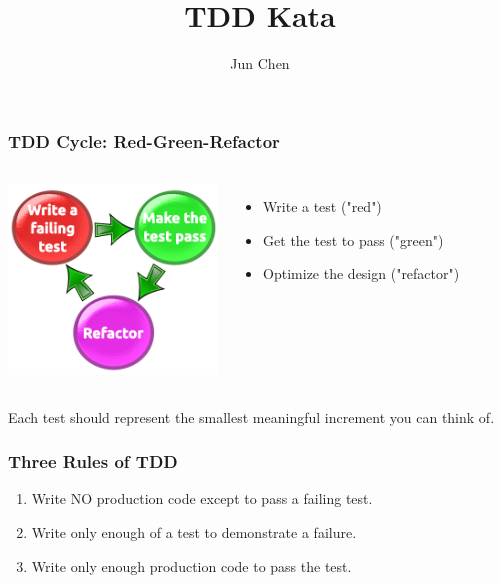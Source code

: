 \documentclass{beamer}
\title{TDD Kata}
\author{Jun Chen}
\begin{document}

\begin{frame}
\titlepage
\end{frame}


\begin{frame}
 \frametitle{TDD Cycle: Red-Green-Refactor}

 \begin{columns}

 \includegraphics[height=2.0in]{TDD-cycle}

 \begin{itemize}
  \item \small {Write a test ("red")}
  \item \small {Get the test to pass ("green")}
  \item \small {Optimize the design ("refactor")}
 \end{itemize}
 \end{columns}
 \pause
 Each test should represent the smallest meaningful increment you can think of.
\end{frame}

\begin{frame}
 \frametitle{Three Rules of TDD}
 \pause
 \begin{enumerate}
  \item Write \alert{NO} production code except to pass a failing test.
  \pause
  \item Write only \alert{enough} of a test to demonstrate a failure.
  \pause
  \item Write only \alert{enough} production code to pass the test.
 \end{enumerate}
\end{frame}
\end{document}
